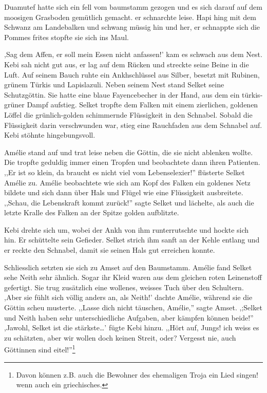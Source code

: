 \documentclass[11pt,titlepage,a5paper]{book}
\begin{document}
Duamutef hatte sich ein fell vom baumstamm gezogen und es sich darauf auf dem moosigen Grasboden gemütlich gemacht. er schnarchte leise. Hapi hing mit dem Schwanz am Landebalken und schwang müssig hin und her, er schnappte sich die Pommes frites stopfte sie sich ins Maul.

,Sag dem Affen, er soll mein Essen nicht anfassen!' kam es schwach aus dem Nest. Kebi sah nicht gut aus, er lag auf dem Rücken und streckte seine Beine in die Luft. Auf seinem Bauch ruhte ein Ankhschlüssel aus Silber, besetzt mit Rubinen, grünem Türkis und Lapislazuli.  Neben seinem Nest stand Selket seine Schutzgöttin. Sie hatte eine blaue Fayencebecher in der Hand, aus dem ein türkis-grüner Dampf aufstieg. Selket tropfte dem Falken mit einem zierlichen, goldenen Löffel die grünlich-golden schimmernde Flüssigkeit in den Schnabel. Sobald die Flüssigkeit darin verschwunden war, stieg eine Rauchfaden aus dem Schnabel auf. Kebi stöhnte hingebungsvoll.

Amélie stand auf und trat leise neben die Göttin, die sie nicht ablenken wollte. Die tropfte geduldig immer einen Tropfen und beobachtete dann ihren Patienten. ,,Er ist so klein, da braucht es nicht viel vom Lebenselexier!'' flüsterte Selket Amélie zu. Amélie beobachtete wie  sich am Kopf des Falken ein goldenes Netz bildete und sich dann über Hals und Flügel wie eine Flüssigkeit ausbreitete. ,,Schau, die Lebenskraft kommt zurück!'' sagte Selket und lächelte, als auch die letzte Kralle des Falken an der Spitze golden aufblitzte.

Kebi drehte sich um, wobei der Ankh von ihm runterrutschte und hockte sich hin. Er schüttelte sein Gefieder. Selket strich ihm sanft an der Kehle entlang und er reckte den Schnabel, damit sie seinen Hals gut erreichen konnte.

Schliesslich setzten sie sich zu Amset auf den Baumstamm. Amélie fand Selket sehe Neith sehr ähnlich. Sogar ihr Kleid waren aus dem gleichen roten Leinenstoff gefertigt. Sie trug zusätzlich eine wollenes, weisses Tuch über den Schultern. ,Aber sie fühlt sich völlig anders an, als Neith!' dachte Amélie, während sie die Göttin scheu musterte. ,,Lasse dich nicht täuschen, Amélie,'' sagte Amset. ,;Selket und Neith haben sehr unterschiedliche Aufgaben, aber kämpfen können beide!'' ,Jawohl, Selket ist die stärkste\dots' fügte Kebi hinzu. ,,Hört auf, Jungs! ich weiss es zu schätzten, aber wir wollen doch keinen Streit, oder? Vergesst nie, auch Göttinnen sind eitel!''\footnote{Davon können z.B. auch die Bewohner des ehemaligen Troja ein Lied singen! wenn auch ein griechisches.}
\end{document}
